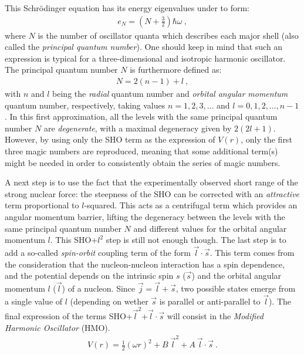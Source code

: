 This Schrödinger equation has its energy eigenvalues under to form:
\begin{align}
    e_N=\left(N+\frac{3}{2}\right)\hbar\omega\ ,
\end{align}
where $N$ is the number of oscillator quanta which describes each major shell (also called the \emph{principal quantum number}). One should keep in mind that such an expression is typical for a three-dimensional and isotropic harmonic oscillator. The principal quantum number $N$ is furthermore defined as:
\begin{align}
    N=2(n-1)+l\ ,
\end{align}
with $n$ and $l$ being the \emph{radial} quantum number and \emph{orbital angular momentum} quantum number, respectively, taking values $n=1,2,3,\dots$ and $l=0,1,2,\dots,n-1$. In this first approximation, all the levels with the same principal quantum number $N$ are \emph{degenerate}, with a maximal degeneracy given by $2(2l+1)$. However, by using only the SHO term as the expression of $V(r)$, only the first three magic numbers are reproduced, meaning that some additional term(s) might be needed in order to consistently obtain the series of magic numbers.

A next step is to use the fact that the experimentally observed short range of the strong nuclear force: the steepness of the SHO can be corrected with an \emph{attractive} term proportional to $l$-squared. This acts as a centrifugal term which provides an angular momentum barrier, lifting the degeneracy between the levels with the same principal quantum number $N$ and different values for the orbital angular momentum $l$. This SHO+$l^2$ step is still not enough though. The last step is to add a so-called \emph{spin-orbit} coupling term of the form $\vec{l}\cdot\vec{s}$. 
This term comes from the consideration that the nucleon-nucleon interaction has a spin dependence, and the potential depends on the intrinsic spin $s$ ($\vec{s}$) and the orbital angular momentum $l$ ($\vec{l}$) of a nucleon. Since $\vec{j}=\vec{l}+\vec{s}$, two possible states emerge from a single value of $l$ (depending on wether $\vec{s}$ is parallel or anti-parallel to $\vec{l}$). The final expression of the terms SHO+$\vec{l}^2$+$\vec{l}\cdot\vec{s}$ will consist in the \emph{Modified Harmonic Oscillator} (HMO).
\begin{align}
    V(r)=\frac{1}{2}(\omega r)^2+B\ \vec{l}^2+A\ \vec{l}\cdot\vec{s}\ .
    \label{modified-harmonic-oscillator-eq}
\end{align}

